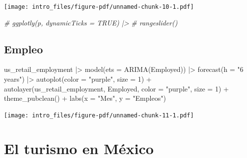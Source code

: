 \documentclass[
  letterpaper,
  DIV=11,
  numbers=noendperiod]{scrartcl}
\newenvironment{Shaded}{}{}
\newcommand{\AttributeTok}[1]{\textcolor[rgb]{0.65,0.15,0.64}{#1}}
\newcommand{\CommentTok}[1]{\textcolor[rgb]{0.63,0.63,0.65}{\textit{#1}}}
\newcommand{\DecValTok}[1]{\textcolor[rgb]{0.60,0.41,0.00}{#1}}
\newcommand{\FunctionTok}[1]{\textcolor[rgb]{0.25,0.47,0.95}{#1}}
\newcommand{\NormalTok}[1]{\textcolor[rgb]{0.22,0.23,0.26}{#1}}
\newcommand{\SpecialCharTok}[1]{\textcolor[rgb]{0.00,0.52,0.74}{#1}}
\newcommand{\StringTok}[1]{\textcolor[rgb]{0.31,0.63,0.31}{#1}}
\begin{document}
\texttt{[image: intro\_files/figure-pdf/unnamed-chunk-10-1.pdf]}

\begin{Shaded}
\begin{Highlighting}[]
\CommentTok{\# ggplotly(p, dynamicTicks = TRUE) |\textgreater{} }
\CommentTok{\#   rangeslider()}
\end{Highlighting}
\end{Shaded}

\subsection{Empleo}\label{empleo-1}

\begin{Shaded}
\begin{Highlighting}[]
\NormalTok{us\_retail\_employment }\SpecialCharTok{|\textgreater{}} 
  \FunctionTok{model}\NormalTok{(}\AttributeTok{ets =} \FunctionTok{ARIMA}\NormalTok{(Employed)) }\SpecialCharTok{|\textgreater{}} 
  \FunctionTok{forecast}\NormalTok{(}\AttributeTok{h =} \StringTok{"6 years"}\NormalTok{) }\SpecialCharTok{|\textgreater{}} 
  \FunctionTok{autoplot}\NormalTok{(}\AttributeTok{color =} \StringTok{"purple"}\NormalTok{, }\AttributeTok{size =} \DecValTok{1}\NormalTok{) }\SpecialCharTok{+}
  \FunctionTok{autolayer}\NormalTok{(us\_retail\_employment, Employed, }\AttributeTok{color =} \StringTok{"purple"}\NormalTok{, }\AttributeTok{size =} \DecValTok{1}\NormalTok{) }\SpecialCharTok{+}
  \FunctionTok{theme\_pubclean}\NormalTok{() }\SpecialCharTok{+}
  \FunctionTok{labs}\NormalTok{(}\AttributeTok{x =} \StringTok{"Mes"}\NormalTok{, }\AttributeTok{y =} \StringTok{"Empleos"}\NormalTok{)}
\end{Highlighting}
\end{Shaded}

\texttt{[image: intro\_files/figure-pdf/unnamed-chunk-11-1.pdf]}

\subsection{}\label{section-7}

\section{El turismo en México}\label{el-turismo-en-muxe9xico}

\subsection{}\label{section-8}
\end{document}
